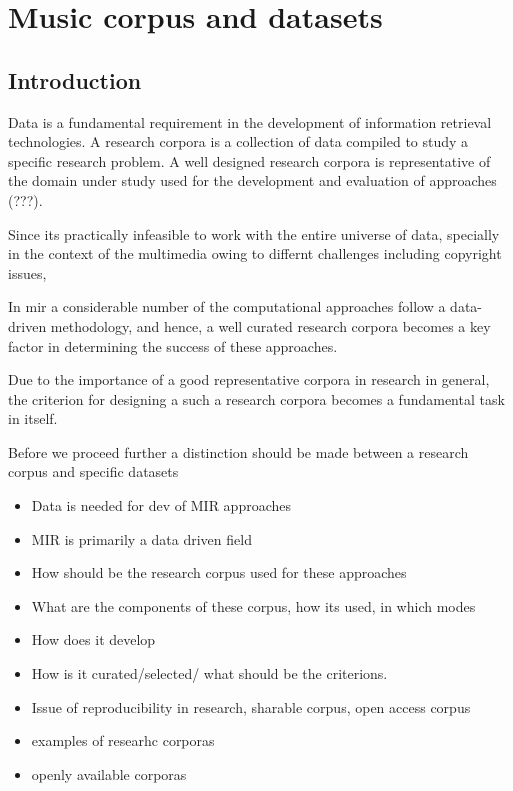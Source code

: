 
\chapter{Music corpus and datasets}\label{chap:datasets}

\section{Introduction}
\label{sec:corpus_intro}

Data is a fundamental requirement in the development of information retrieval technologies. A research corpora is a collection of data compiled to study a specific research problem. A well designed research corpora is representative of the domain under study used for the development and evaluation of approaches (???). 

Since its practically infeasible to work with the entire universe of data, specially in the context of the multimedia owing to differnt challenges including copyright issues, 

In \gls{mir} a considerable number of the computational approaches follow a data-driven methodology, and hence, a well curated research corpora becomes a key factor in determining the success of these approaches. 

Due to the importance of a good representative corpora in research in general, the criterion for designing a such a research corpora becomes a fundamental task in itself.





Before we proceed further a distinction should be made between a research corpus and specific datasets


 


\begin{itemize}
	\item Data is needed for dev of MIR approaches
	\item MIR is primarily a data driven field
	\item How should be the research corpus used for these approaches
	\item What are the components of these corpus, how its used, in which modes
	\item How does it develop
	\item How is it curated/selected/ what should be the criterions. 
	\item Issue of reproducibility in research, sharable corpus, open access corpus
	\item examples of researhc corporas 
	\item openly available corporas
	
\end{itemize}


